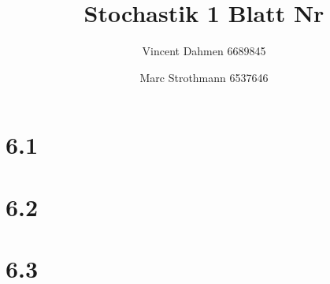 \documentclass[12pt,a4paper]{article}
\title{Stochastik 1 Blatt Nr \Nr}
\author{Vincent Dahmen 6689845 \and Marc Strothmann 6537646}
\gdef\Nr{6}
\begin{document}
\maketitle{}


\section*{\Nr.1}


\section*{\Nr.2}


\section*{\Nr.3}

\end{document}
